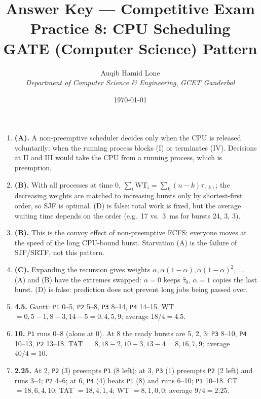 \documentclass[11pt]{article}
\title{Answer Key --- Competitive Exam Practice 8: CPU Scheduling\\\large GATE (Computer Science) Pattern}
\author{Auqib Hamid Lone\\[0.3em]
  \emph{Department of Computer Science \& Engineering}, \emph{GCET Ganderbal}}
\date{\today}
\begin{document}
\maketitle

\begin{enumerate}
\item[\textbf{Q1}] \textbf{(A).} A non-preemptive scheduler decides only when the CPU is released voluntarily: when the running process blocks (I) or terminates (IV). Decisions at II and III would take the CPU from a running process, which is preemption.

\item[\textbf{Q2}] \textbf{(B).} With all processes at time 0, $\sum_i \mathrm{WT}_i = \sum_k (n-k)\tau_{(k)}$; the decreasing weights are matched to increasing bursts only by shortest-first order, so SJF is optimal. (D) is false: total work is fixed, but the average waiting time depends on the order (e.g.\ 17 vs.\ 3~ms for bursts 24, 3, 3).

\item[\textbf{Q3}] \textbf{(B).} This is the convoy effect of non-preemptive FCFS: everyone moves at the speed of the long CPU-bound burst. Starvation (A) is the failure of SJF/SRTF, not this pattern.

\item[\textbf{Q4}] \textbf{(C).} Expanding the recursion gives weights $\alpha, \alpha(1-\alpha), \alpha(1-\alpha)^2, \ldots$. (A) and (B) have the extremes swapped: $\alpha = 0$ keeps $\hat{\tau}_0$, $\alpha = 1$ copies the last burst. (D) is false: prediction does not prevent long jobs being passed over.

\item[\textbf{Q5}] \textbf{4.5.} Gantt: \texttt{P1} 0--5, \texttt{P2} 5--8, \texttt{P3} 8--14, \texttt{P4} 14--15. WT $= 0, 5-1, 8-3, 14-5 = 0, 4, 5, 9$; average $18/4 = 4.5$.

\item[\textbf{Q6}] \textbf{10.} \texttt{P1} runs 0--8 (alone at 0). At 8 the ready bursts are 5, 2, 3: \texttt{P3} 8--10, \texttt{P4} 10--13, \texttt{P2} 13--18. TAT $= 8, 18-2, 10-3, 13-4 = 8, 16, 7, 9$; average $40/4 = 10$.

\item[\textbf{Q7}] \textbf{2.25.} At 2, \texttt{P2} (3) preempts \texttt{P1} (8 left); at 3, \texttt{P3} (1) preempts \texttt{P2} (2 left) and runs 3--4; \texttt{P2} 4--6; at 6, \texttt{P4} (4) beats \texttt{P1} (8) and runs 6--10; \texttt{P1} 10--18. CT $= 18, 6, 4, 10$; TAT $= 18, 4, 1, 4$; WT $= 8, 1, 0, 0$; average $9/4 = 2.25$.


\end{enumerate}
\end{document}
